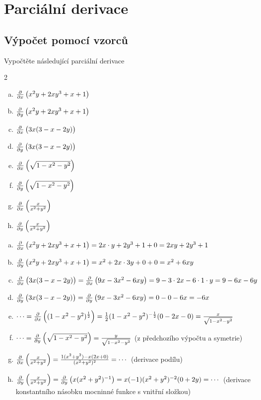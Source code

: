 \section{Parciální derivace}

\subsection{Výpočet pomocí vzorců}

Vypočtěte následující parciální derivace

\newcommand\pd[2][x]{\frac{\partial }{\partial #1}\left(\vphantom {\frac 22}#2\right)}
\begin{multicols}2
\begin{enumerate}[a)]
\item $\pd{x^2y+2xy^3+x+1}$
\item $\pd[y]{x^2y+2xy^3+x+1}$
\item $\pd{3x(3-x-2y)}$
\item $\pd[y]{3x(3-x-2y)}$
\item $\pd[x]{\sqrt{1-x^2-y^2}}$
\item $\pd[y]{\sqrt{1-x^2-y^2}}$
\item $\pd[x]{\frac x{x^2+y^2}}$
\item $\pd[y]{\frac x{x^2+y^2}}$
\end{enumerate}
\end{multicols}

\reseni
\begin{enumerate}[a)]
\item $\pd{x^2y+2xy^3+x+1}=2x\cdot y+2y^3+1+0=2xy+2y^3+1$
\item $\pd[y]{x^2y+2xy^3+x+1}=x^2+2x\cdot 3y+0+0=x^2+6xy$
\item $\pd{3x(3-x-2y)}=\pd{9x-3x^2-6xy}=9-3\cdot 2x-6\cdot 1\cdot y=9-6x-6y$
\item $\pd[y]{3x(3-x-2y)}=\pd[y]{9x-3x^2-6xy}=0-0-6x=-6x$
\item $\cdots=\pd[x]{(1-x^2-y^2)^{\frac 12}}=\frac 12 (1-x^2-y^2)^{-\frac 12} (0-2x-0)=
  \frac {x}{\sqrt{1-x^2-y^2}}$
\item $\cdots=\pd[y]{\sqrt{1-x^2-y^2}}= \frac {y}{\sqrt{1-x^2-y^2}}$ (z předchozího výpočtu a symetrie)
  
\item $\pd[x]{\frac x{x^2+y^2}}=\frac{1(x^2+y^2)-x(2x+0)}{(x^2+y^2)^2}=\cdots$ (derivace podílu)
\item $\pd[y]{\frac x{x^2+y^2}}=\pd[y]{x(x^2+y^2)^{-1}}=x(-1)(x^2+y^2)^{-2}(0+2y)=\cdots$ (derivace konstantního násobku mocninné funkce s vnitřní složkou)

\end{enumerate}


